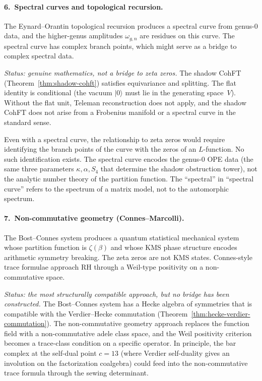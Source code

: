 \documentclass[11pt]{article}
\begin{document}
\paragraph{6.~Spectral curves and topological recursion.}
The Eynard--Orantin topological recursion produces a spectral
curve from genus-$0$ data, and the higher-genus amplitudes
$\omega_{g,n}$ are residues on this curve.  The spectral curve
has complex branch points, which might serve as a bridge to
complex spectral data.

\emph{Status: genuine mathematics, not a bridge to zeta zeros.}
The shadow CohFT (Theorem~\ref{thm:shadow-cohft}) satisfies
equivariance and splitting.  The flat identity is conditional
(the vacuum $|0\rangle$ must lie in the generating space~$V$).
Without the flat unit, Teleman reconstruction does not apply,
and the shadow CohFT does not arise from a Frobenius manifold
or a spectral curve in the standard sense.

Even with a spectral curve, the relationship to zeta zeros
would require identifying the branch points of the curve with
the zeros of an $L$-function.  No such identification exists.
The spectral curve encodes the genus-$0$ OPE data (the same
three parameters $\kappa, \alpha, S_4$ that determine the
shadow obstruction tower), not the analytic number theory of the partition
function.  The ``spectral'' in ``spectral curve'' refers to the
spectrum of a matrix model, not to the automorphic spectrum.

\paragraph{7.~Non-commutative geometry (Connes--Marcolli).}
The Bost--Connes system produces a quantum statistical
mechanical system whose partition function is $\zeta(\beta)$
and whose KMS phase structure encodes arithmetic symmetry
breaking.  The zeta zeros are not KMS states.  Connes-style
trace formulae approach
$\mathrm{RH}$ through a Weil-type positivity on a
non-commutative space.

\emph{Status: the most structurally compatible approach, but
no bridge has been constructed.}  The Bost--Connes system has
a Hecke algebra of symmetries that is compatible with the
Verdier--Hecke commutation
(Theorem~\ref{thm:hecke-verdier-commutation}).  The
non-commutative geometry approach replaces the function field
with a non-commutative adele class space, and the Weil
positivity criterion becomes a trace-class condition on a
specific operator.  In principle, the bar complex at the
self-dual point $c = 13$ (where Verdier self-duality gives an
involution on the factorization coalgebra) could feed into the
non-commutative trace formula through the sewing determinant.
\end{document}
